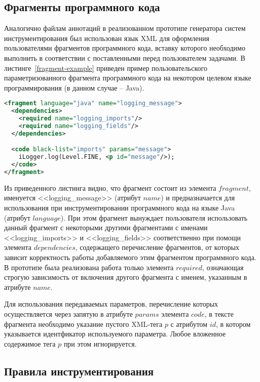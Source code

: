\subsection{Фрагменты программного кода}

Аналогично файлам аннотаций в реализованном прототипе генератора систем инструментирования был использован язык XML для оформления пользователями фрагментов программного кода, вставку которого необходимо выполнить в соответствии с поставленными перед пользователем задачами.
В листинге~\ref{fragment-example} приведен пример пользовательского параметризованного фрагмента программного кода на некотором целевом языке программирования (в данном случае -- Java).

\begin{lstlisting}[frame=single, language=XML, label={fragment-example}, caption={Пример пользовательского фрагмента.}]
<fragment language="java" name="logging_message">
  <dependencies>
    <required name="logging_imports"/>
    <required name="logging_fields"/>
  </dependencies>

  <code black-list="imports" params="message">
    iLogger.log(Level.FINE, <p id="message"/>);
  </code>
</fragment>
\end{lstlisting}

Из приведенного листинга видно, что фрагмент состоит из элемента $fragment$, именуется <<logging\_message>> (атрибут $name$) и предназначается для использования при инструментировании программного кода на языке Java (атрибут $language$).
При этом фрагмент вынуждает пользователя использовать данный фрагмент с некоторыми другими фрагментами с именами <<logging\_imports>> и <<logging\_fields>> соответственно при помощи элемента $dependencies$, содержащего перечисление фрагментов, от которых зависит корректность работы добавляемого этим фрагментом программного кода.
В прототипе была реализована работа только элемента $required$, означающая строгую зависимость от включения другого фрагмента с именем, указанным в атрибуте $name$.

Для использования передаваемых параметров, перечисление которых осуществляется через запятую в атрибуте $params$ элемента $code$, в тексте фрагмента необходимо указание пустого XML-тега $p$ с атрибутом $id$, в котором указывается идентфикатор используемого параметра.
Любое вложенное содержимое тега $p$ при этом игнорируется.

\subsection{Правила инструментирования}

